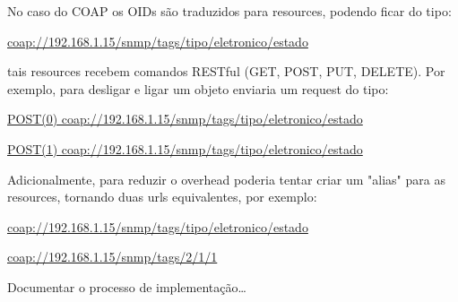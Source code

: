 \documentclass[twoside,english,brazilian]{UNISINOSmonografia}
\begin{document}
No caso do COAP os OIDs são traduzidos para resources, podendo ficar do tipo: 

\url{coap://192.168.1.15/snmp/tags/tipo/eletronico/estado}

tais resources recebem comandos RESTful (GET, POST, PUT, DELETE). Por exemplo, 
para desligar e ligar um objeto enviaria um request do tipo:

\url{POST(0) coap://192.168.1.15/snmp/tags/tipo/eletronico/estado}

\url{POST(1) coap://192.168.1.15/snmp/tags/tipo/eletronico/estado}

Adicionalmente, para reduzir o overhead poderia tentar criar um "alias" para 
as resources, tornando duas urls equivalentes, por exemplo:

\url{coap://192.168.1.15/snmp/tags/tipo/eletronico/estado}

\url{coap://192.168.1.15/snmp/tags/2/1/1}

	
	
	

	Documentar o processo de implementação\ldots
	
	
	
	



%


%
\end{document}
